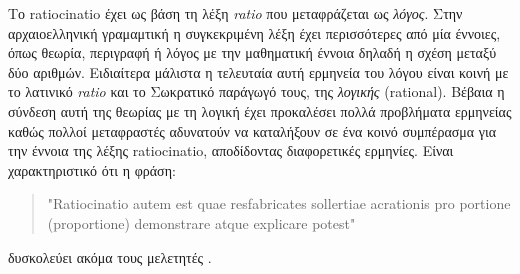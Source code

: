 \begin{description}[style=nextline]
Το ratiocinatio έχει ως βάση τη λέξη \emph{ratio} που μεταφράζεται ως \emph{λόγος}. Στην αρχαιοελληνική γραμαμτική η συγκεκριμένη λέξη έχει περισσότερες από μία έννοιες, όπως θεωρία, περιγραφή ή λόγος με την μαθηματική έννοια δηλαδή η σχέση μεταξύ δύο αριθμών. Ειδιαίτερα μάλιστα η τελευταία αυτή ερμηνεία του λόγου είναι κοινή με το λατινικό \emph{ratio} και το Σωκρατικό παράγωγό τους, της \emph{λογικής} (rational). Βέβαια η σύνδεση αυτή της θεωρίας με τη λογική έχει προκαλέσει πολλά προβλήματα ερμηνείας καθώς πολλοί μεταφραστές αδυνατούν να καταλήξουν σε ένα κοινό συμπέρασμα για την έννοια της λέξης ratiocinatio, αποδίδοντας διαφορετικές ερμηνίες. Είναι χαρακτηριστικό ότι η φράση: 
\begin{quote}
"Ratiocinatio autem est quae resfabricates sollertiae acrationis pro portione (proportione) demonstrare atque explicare potest"
\end{quote}
δυσκολεύει ακόμα τους μελετητές \cite{graham-education}.
\end{description}











